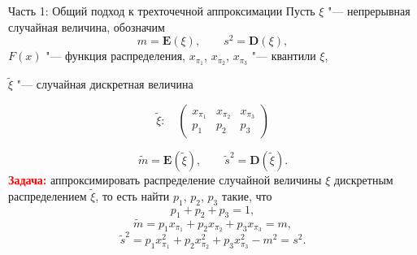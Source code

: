 \documentclass[ucs, notheorems, handout]{beamer}
\begin{document}
	\begin{frame}{Часть 1: Общий подход к трехточечной аппроксимации}
		Пусть $\xi$ "--- непрерывная случайная величина, обозначим  \[m = \mathbf E(\xi), \quad\quad s^{2} = \mathbf D(\xi),\]  $F(x)$ "--- функция распределения,
		$x_{\pi_{1}}$, $x_{\pi_{2}}$, $x_{\pi_{3}}$ "--- квантили $\xi$,
		
		$\tilde{\xi}$ "--- случайная дискретная величина 
		
		\[\tilde{\xi}:\quad\begin{pmatrix} 
			x_{\pi_{1}}&x_{\pi_{2}}&x_{\pi_{3}}\\ 
			p_{1} &  p_{2}  & p_{3}
		\end{pmatrix}\]
		
		\[\tilde{m} = \mathbf E(\tilde{\xi}), \quad\quad \tilde{s}^{2} = \mathbf D(\tilde{\xi}).\]
		\textcolor{red}{\textbf{Задача:}} аппроксимировать распределение случайной величины $\xi$ дискретным распределением $\tilde{\xi}$, то есть найти $p_{1}$, $p_{2}$, $p_{3}$ такие, что 
		\begin{equation*}
			p_{1} + p_{2} + p_{3} = 1, \label{1}
		\end{equation*}
		\begin{equation*}
			\tilde{m} = p_{1}x_{\pi_{1}} + p_{2}x_{\pi_{2}} + p_{3}x_{\pi_{3}} = m, \label{2}
		\end{equation*}
		\begin{equation*}
			\tilde{s}^{2} = p_{1} x_{\pi_{1}}^{2} + p_{2} x_{\pi_{2}}^{2} + p_{3} x_{\pi_{3}}^{2} - m^{2} = s^{2}. \label{3}
		\end{equation*}
		
	\end{frame}
	
\end{document}
